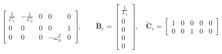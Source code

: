 \documentclass[11pt,a4paper,oneside]{book}
\numberwithin{equation}{section}
\theoremstyle{it}
\theoremstyle{definition}
\begin{document}
\begin{mybox}
\begin{equation*}
\begin{bmatrix}
			\frac{1}{C_1} & -\frac{1}{C_2} & 0 & 0 & 0 \\[6pt]
			0 & 0 & 0 & 0 & 1 \\[6pt]
			0 & 0 & 0 & -\omega_n^2 & 0
		\end{bmatrix},\qquad
		\tilde{\mathbf{B}}_e =  
		\begin{bmatrix}
			\frac{1}{L_1} \\[6pt]
			0 \\[6pt]
			0 \\[6pt]
			0 \\[6pt]
			0
		\end{bmatrix}, \quad
		\tilde{\mathbf{C}}_e = 
		\begin{bmatrix}
			1 & 0 & 0 & 0 & 0 \\[6pt]
			0 & 0 & 1 & 0 & 0
		\end{bmatrix} 
	\end{equation*}
\end{mybox}
\end{document}
